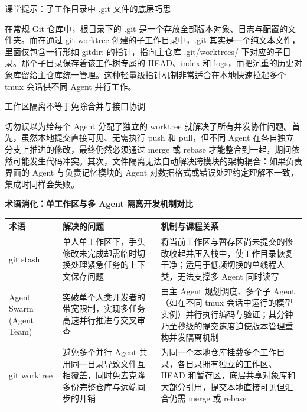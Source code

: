 \documentclass[UTF8,a4paper,11pt,fontset=fandol]{ctexart}
\begin{document}
\begin{knowledgebox}{课堂提示：子工作目录中 .git 文件的底层巧思}

在常规 Git 仓库中，根目录下的 .git 是一个存放全部版本对象、日志与配置的文件夹。而在通过 git worktree 创建的子工作目录中，.git 其实是一个纯文本文件，里面仅包含一行形如 gitdir: 的指针，指向主仓库 .git/worktrees/ 下对应的子目录。那个子目录保存着该工作树专属的 HEAD、index 和 logs，而把沉重的历史对象库留给主仓库统一管理。这种轻量级指针机制非常适合在本地快速拉起多个 tmux 会话供不同 Agent 并行工作。

\end{knowledgebox}

\begin{warningbox}{工作区隔离不等于免除合并与接口协调}

切勿误以为给每个 Agent 分配了独立的 worktree 就解决了所有并发协作问题。首先，虽然本地提交直接可见、无需执行 push 和 pull，但不同 Agent 在各自独立分支上推进的修改，最终仍然必须通过 merge 或 rebase 才能整合到一起，期间依然可能发生代码冲突。其次，文件隔离无法自动解决跨模块的架构耦合：如果负责界面的 Agent 与负责记忆模块的 Agent 对数据格式或错误处理约定理解不一致，集成时同样会失败。

\end{warningbox}

\par{}\textbf{术语消化：单工作区与多 Agent 隔离开发机制对比}

\begin{center}\small\begin{tabularx}{\linewidth}{YYY}

\toprule

术语 & 解决的问题 & 机制与课程关系\\\midrule

git stash & 单人单工作区下，手头修改未完成却需临时切换处理紧急任务的上下文保存问题 & 将当前工作区与暂存区尚未提交的修改收起并压入栈中，使工作目录恢复干净；适用于低频切换的单线程人类，无法支撑多 Agent 同时读写\\[3pt]

Agent Swarm (Agent Team) & 突破单个人类开发者的带宽限制，实现多任务高速并行推进与交叉审查 & 由主 Agent 规划调度、多个子 Agent（如在不同 tmux 会话中运行的模型实例）并行执行编码与验证；其分钟乃至秒级的提交速度迫使版本管理重构并发隔离机制\\[3pt]

git worktree & 避免多个并行 Agent 共用同一目录导致文件互相覆盖，同时免去克隆多份完整仓库与远端同步的开销 & 为同一个本地仓库挂载多个工作目录，各目录拥有独立的工作区、HEAD 和暂存区，底层共享对象库和大部分引用，提交本地直接可见但汇合仍需 merge 或 rebase\\[3pt]

\bottomrule\end{tabularx}\end{center}
\end{document}
